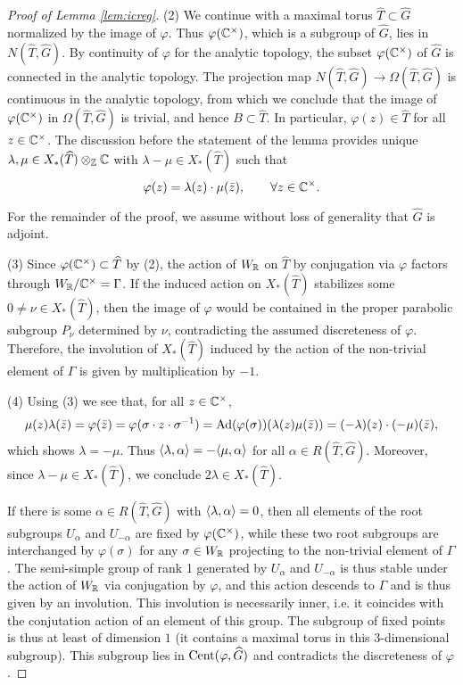 \documentclass{article}
\theoremstyle{definition}
\numberwithin{equation}{section}
\renewcommand{\-}{\hyp{}}
\begin{document}
\begin{proof}[Proof of Lemma \ref{lem:icreg}]
(2) We continue with a maximal torus $\hat T \subset \hat G$ normalized by the image of $\varphi$. Thus $\varphi(\mathbb{C}^\times)$, which is a subgroup of $\hat G$, lies in $N(\hat T,\hat G)$. By continuity of $\varphi$ for the analytic topology, the subset $\varphi(\mathbb{C}^\times)$ of $\hat G$ is connected in the analytic topology. The projection map $N(\hat T,\hat G) \to \Omega(\hat T,\hat G)$ is continuous in the analytic topology, from which we conclude that the image of $\varphi(\mathbb{C}^\times)$ in $\Omega(\hat T,\hat G)$ is trivial, and hence $B \subset \hat T$. In particular, $\varphi(z) \in \hat T$ for all $z \in \mathbb{C}^\times$. The discussion before the statement of the lemma provides unique $\lambda,\mu \in X_*(\widehat T)\otimes_{\mathbb{Z}}\mathbb{C}$ with $\lambda-\mu \in X_*(\hat T)$ such that
\[ \varphi(z) = \lambda(z) \cdot \mu(\bar z),\qquad \forall z \in \mathbb{C}^\times. \]

For the remainder of the proof, we assume without loss of generality that $\hat G$ is adjoint.

(3) Since $\varphi(\mathbb{C}^\times) \subset \widehat T$ by (2), the action of $W_{\mathbb{R}}$ on $\hat T$ by conjugation via $\varphi$ factors through $W_{\mathbb{R}}/\mathbb{C}^\times=\Gamma$. If the induced action on $X_*(\hat T)$ stabilizes some $0 \neq \nu \in X_*(\hat T)$, then the image of $\varphi$ would be contained in the proper parabolic subgroup $P_\nu$ determined by $\nu$, contradicting the assumed discreteness of $\varphi$. Therefore, the involution of $X_*(\hat T)$ induced by the action of the non-trivial element of $\Gamma$ is given by multiplication by $-1$. 

(4) Using (3) we see that, for all $z \in \mathbb{C}^\times$,
\[ \mu(z)\lambda(\bar z)=\varphi(\bar z)=\varphi(\sigma \cdot z \cdot \sigma^{-1})=\textrm{Ad}(\varphi(\sigma))(\lambda(z)\mu(\bar z))=(-\lambda)(z) \cdot (-\mu)(\bar z), \] which shows $\lambda=-\mu$. Thus $\langle\lambda,\alpha\rangle=-\langle\mu,\alpha\rangle$ for all $\alpha \in R(\hat T,\hat G)$. Moreover, since $\lambda-\mu \in X_*(\hat T)$, we conclude $2\lambda \in X_*(\hat T)$.

If there is some $\alpha \in R(\hat T,\hat G)$ with $\langle\lambda,\alpha\rangle=0$, then all elements of the root subgroups $U_\alpha$ and $U_{-\alpha}$ are fixed by $\varphi(\mathbb{C}^\times)$, while these two root subgroups are interchanged by $\varphi(\sigma)$ for any $\sigma \in W_{\mathbb{R}}$ projecting to the non-trivial element of $\Gamma$. The semi-simple group of rank 1 generated by $U_\alpha$ and $U_{-\alpha}$ is thus stable under the action of $W_{\mathbb{R}}$ via conjugation by $\varphi$, and this action descends to $\Gamma$ and is thus given by an involution. This involution is necessarily inner, i.e. it coincides with the conjutation action of an element of this group. The subgroup of fixed points is thus at least of dimension $1$ (it contains a maximal torus in this 3-dimensional subgroup). This subgroup lies in $\textrm{Cent}(\varphi,\widehat G)$ and contradicts the discreteness of $\varphi$.


\end{proof}
\end{document}
